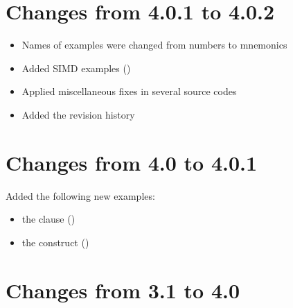 \section{Changes from 4.0.1 to 4.0.2}

\begin{itemize}
\item Names of examples were changed from numbers to mnemonics
\item Added SIMD examples                         ()
\item Applied miscellaneous fixes in several source codes
\item Added the revision history
\end{itemize}

\section{Changes from 4.0 to 4.0.1}

Added the following new examples:
\begin{itemize}
\item the  clause   ()
\item the  construct ()
\end{itemize}

\section{Changes from 3.1 to 4.0}


